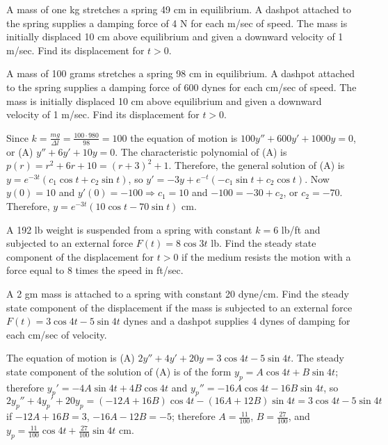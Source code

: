 \documentclass{ximera}
\begin{document}
\begin{problem}\label{exer:6.2.15}
A mass of one kg stretches a spring 49 cm in equilibrium. A dashpot
attached to the spring supplies a damping force of 4 N for each m/sec
of speed. The mass is initially displaced 10 cm above equilibrium and
given a downward velocity of 1 m/sec. Find its displacement for $t>0$.
\end{problem}

\begin{problem}\label{exer:6.2.16}
A mass of 100 grams stretches a spring 98 cm in equilibrium. A dashpot
attached to the spring supplies a damping force of 600 dynes for each
cm/sec of speed. The mass is initially displaced 10 cm above
equilibrium and given a downward velocity of 1 m/sec. Find its
displacement for $t>0$.

\begin{solution}
    Since $k=\frac{mg}{\Delta l}=\frac{100\cdot980}{98}=100$ the
equation of motion is
$100y''+600y'+1000y=0$, or
(A) $y''+6y'+10y=0$.
The characteristic polynomial of (A) is
$p(r)=r^2+6r+10=(r+3)^2+1$. Therefore,
the general solution of (A) is
$y=e^{-3t}(c_1\cos t+c_2\sin t)$, so
$y'=-3y+e^{-t}(-c_1\sin t+c_2\cos t)$.
Now $y(0)=10$ and $y'(0)=-100\Rightarrow c_1=10$ and
$-100=-30+c_2$, or $c_2=-70$. Therefore,
$y=e^{-3t}(10\cos t-70\sin t)$ cm.
\end{solution}
\end{problem}

\begin{problem}\label{exer:6.2.17}
A 192 lb weight is suspended from a spring with constant $k=6$ lb/ft
and subjected to an external force $F(t)=8\cos3t$ lb. Find the steady
state component of the displacement for $t>0$ if the medium resists
the motion with a force  equal to 8 times the speed in
ft/sec.
\end{problem}

\begin{problem}\label{exer:6.2.18}
A 2 gm mass is attached to a spring with constant 20 dyne/cm. Find the
steady state component of the displacement if the mass is subjected to
an external force $F(t)=3\cos4t-5\sin4t$ dynes and a dashpot supplies
4 dynes of damping for each cm/sec of velocity.

\begin{solution}
    The equation of motion is
(A) $2y''+4y'+20y=3\cos4t-5\sin4t$.
The steady  state component of the solution of (A)
is of the form
$y_p=A\cos4t+B\sin4t$; therefore $y_p'=-4A\sin4t+4B\cos4t$
and $y_p''=-16A\cos4t-16B\sin4t$, so
$2y_p''+4y_p'+20y_p=(-12A+16B)\cos4t-(16A+12B)\sin4t=3\cos4t-5\sin4t$
if $-12A+16B=3$, $-16A-12B=-5$; therefore $A=\frac{11}{100}$,
$B=\frac{27}{100}$, and
 $y_p=\frac{11}{100}\cos4t+\frac{27}{100}\sin4t$ cm.
\end{solution}
\end{problem}
\end{document}
